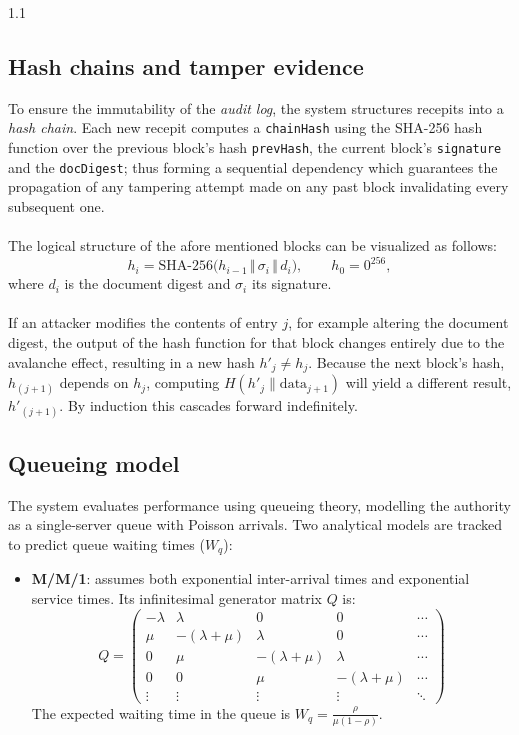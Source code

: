 \documentclass[11pt,a4paper]{article}
\begin{document}
\begin{spacing}{1.1}
\subsection{Hash chains and tamper evidence}
To ensure the immutability of the \emph{audit log}, the system structures recepits into a \textit{hash chain}. Each new recepit computes a \texttt{chainHash} using the SHA-256 hash function over the previous block's hash \texttt{prevHash}, the current block's \texttt{signature} and the \texttt{docDigest}; thus forming a sequential dependency which guarantees the propagation of any tampering attempt made on any past block invalidating every subsequent one.
\\\\
The logical structure of the afore mentioned blocks can be visualized as follows:
\begin{equation}
  h_i = \mathrm{SHA\text{-}256}\bigl(h_{i-1} \,\Vert\, \sigma_i \,\Vert\, d_i\bigr),
  \qquad h_0 = 0^{256},
  \label{eq:chain}
\end{equation}
where $d_i$ is the document digest and $\sigma_i$ its signature.
\\\\
If an attacker modifies the contents of entry $j$, for example altering the document digest, the output of the hash function for that block changes entirely due to the avalanche effect, resulting in a new hash $h'_j \neq h_j$. Because the next block's hash, $h_{(j+1)}$ depends on $h_j$, computing $H(h'_j \parallel \text{data}_{j+1})$ will yield a different result, $h'_{(j+1)}$. By induction this cascades forward indefinitely.

\pagebreak

\subsection{Queueing model}
The system evaluates performance using queueing theory, modelling the authority as a single-server queue with Poisson arrivals. Two analytical models are tracked to predict queue waiting times ($W_q$):

\begin{itemize}
  \item \textbf{M/M/1}: assumes both exponential inter-arrival times and exponential service times. Its infinitesimal generator matrix $Q$ is:
  \[
  Q = \begin{pmatrix}
  -\lambda & \lambda & 0 & 0 & \cdots \\
  \mu & -(\lambda + \mu) & \lambda & 0 & \cdots \\
  0 & \mu & -(\lambda + \mu) & \lambda & \cdots \\
  0 & 0 & \mu & -(\lambda + \mu) & \cdots \\
  \vdots & \vdots & \vdots & \vdots & \ddots
  \end{pmatrix}
  \]
  The expected waiting time in the queue is $W_q = \frac{\rho}{\mu (1 - \rho)}$.


\end{itemize}
\end{spacing}
\end{document}
